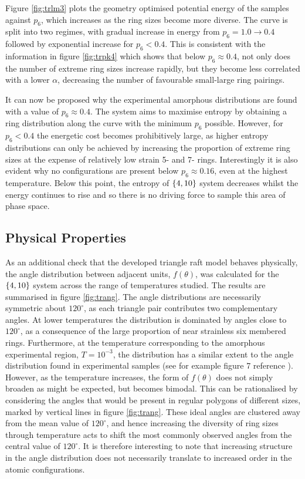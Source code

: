 Figure \ref{fig:trlm3} plots the geometry optimised potential energy of the samples against $p_6$, which increases as the ring sizes become more diverse. 
The curve is split into two regimes, with gradual increase in energy from $p_6=1.0\rightarrow 0.4$ followed by exponential increase for $p_6<0.4$. 
This is consistent with the information in figure \ref{fig:trpk4} which shows that below $p_6\approx 0.4$, not only does the number of extreme ring sizes increase rapidly, but they become less correlated with a lower $\alpha$, decreasing the number of favourable small\--large ring pairings.

It can now be proposed why the experimental amorphous distributions are found with a value of $p_6\approx 0.4$. 
The system aims to maximise entropy by obtaining a ring distribution along the \lm{} curve with the minimum $p_6$ possible. 
However, for $p_6<0.4$ the energetic cost becomes prohibitively large, as higher entropy distributions can only be achieved by increasing the proportion of extreme ring sizes at the expense of relatively low strain 5- and 7- rings.
Interestingly it is also evident why no configurations are present below $p_6\approx 0.16$, even at the highest temperature.
Below this point, the entropy of $\left\{4,10\right\}$ system decreases whilst the energy continues to rise and so there is no driving force to sample this area of phase space.

\subsection{Physical Properties}

As an additional check that the developed triangle raft model behaves physically, 
the angle distribution between adjacent \sioiii{} units, $f\left(\theta\right)$, was calculated for the $\left\{4,10\right\}$ system across the range of temperatures studied. 
The results are summarised in figure \ref{fig:trang}. 
The angle distributions are necessarily symmetric about $120^\circ$, as each triangle pair contributes two complementary angles. 
At lower temperatures the distribution is dominated by angles close to $120^\circ$, as a consequence of the large proportion of near strainless six membered rings.
Furthermore, at the temperature corresponding to the amorphous experimental region, $T=10^{-3}$, the distribution has a similar extent to the angle distribution found in experimental samples (see for example figure 7 reference \cite{Roy2018}). 
However, as the temperature increases, the form of $f\left(\theta\right)$ does not simply broaden as might be expected, but becomes bimodal. 
This can be rationalised by considering the angles that would be present in regular polygons of different sizes, marked by vertical lines in figure \ref{fig:trang}.  These ideal angles are clustered away from the mean value of $120^\circ$, and hence increasing the diversity of ring sizes through temperature acts to shift the most commonly observed angles from the central value of $120^\circ$. 
It is therefore interesting to note that increasing structure in the angle distribution does not necessarily translate to increased order in the atomic configurations.

